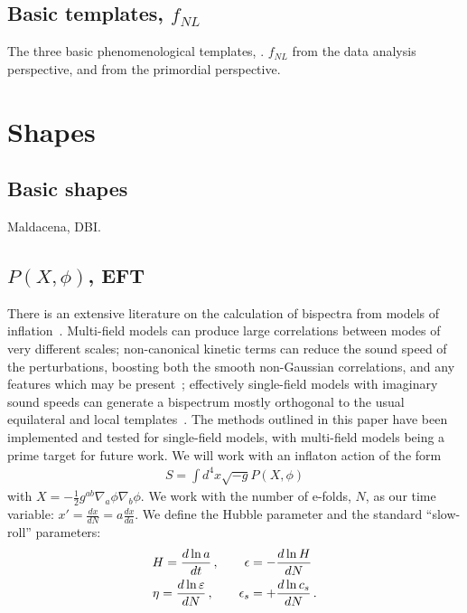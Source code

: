     \subsection{Basic templates, $f_{NL}$}
    The three basic phenomenological templates, \planck.
    $f_{NL}$ from the data analysis perspective,
    and from the primordial perspective.
    \section{Shapes}
    \subsection{Basic shapes}
    Maldacena, DBI.
    \subsection{$P(X, \phi)$, EFT}
    There is an extensive literature on the calculation
of bispectra from models of inflation~\cite{chen_easther_lim_1,chen_easther_lim_2,chen_ng_0605,seery_ng_0503,px_burrage,adshead,flauger_pajer_resonant,features_bartolo,bdy_passaglia}.
Multi-field models can produce large
correlations between modes of very different scales;
non-canonical kinetic terms can reduce the sound speed of the perturbations,
boosting both the smooth non-Gaussian correlations, and any
features which may be present~\cite{dbi_adshead,dbi_in_the_sky,dbi_miranda,dbi_silverstein,dbi_step_miranda,chen_folded_resonant,osc_avila};
effectively single-field models with imaginary sound speeds can generate a bispectrum
mostly orthogonal to the usual equilateral and local templates~\cite{RP_1}.
The methods outlined in this paper have been implemented
and tested for single-field models,
with multi-field models being a prime target for future work.
We will work with an inflaton action of the form
\begin{align}
S = \int d^4x \sqrt{-g}P(X,\phi)
\end{align}
with $X=-\frac{1}{2}g^{ab}\nabla_a \phi\nabla_b \phi$.
We work with the number of e-folds, $N$, as our time variable:
$x'=\frac{dx}{dN}=a\frac{dx}{da}$.
We define the Hubble parameter and the standard ``slow-roll'' parameters:
\begin{equation}
\label{slowrollparams}
\begin{split}
    H = \frac{d\ln a}{dt}	\,,
    \qquad
    \epsilon &= -\frac{d\ln H}{dN}	\\
    \eta = \frac{d\ln \varepsilon}{dN}	\,,
    \qquad
    \epsilon_s &= +\frac{d\ln c_s}{dN}	\,.
\end{split}
\end{equation}

